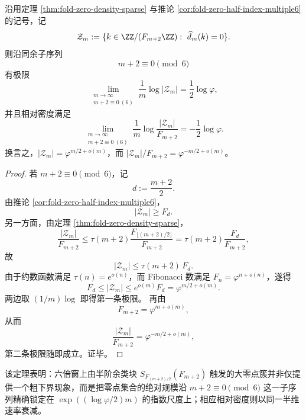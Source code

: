 \begin{theorem}[谱零点集合的半维指数律]\label{thm:xi-fold-zero-set-half-dimensional-exponent-law}
沿用定理 \ref{thm:fold-zero-density-sparse} 与推论 \ref{cor:fold-zero-half-index-multiple6} 的记号，记
\[
\mathcal Z_m:=\{k\in \ZZ/(F_{m+2}\ZZ):\ \widehat d_m(k)=0\}.
\]
则沿同余子序列
\[
m+2\equiv 0\pmod 6
\]
有极限
\[
\boxed{\;
\lim_{\substack{m\to\infty\\ m+2\equiv 0\ (6)}}
\frac{1}{m}\log|\mathcal Z_m|
=
\frac12\log\varphi,\;}
\]
并且相对密度满足
\[
\boxed{\;
\lim_{\substack{m\to\infty\\ m+2\equiv 0\ (6)}}
\frac{1}{m}\log\frac{|\mathcal Z_m|}{F_{m+2}}
=
-\frac12\log\varphi.\;}
\]
换言之，\(|\mathcal Z_m|=\varphi^{m/2+o(m)}\)，而 \(|\mathcal Z_m|/F_{m+2}=\varphi^{-m/2+o(m)}\)。
\end{theorem}
\begin{proof}
若 \(m+2\equiv 0\pmod 6\)，记
\[
d:=\frac{m+2}{2}.
\]
由推论 \ref{cor:fold-zero-half-index-multiple6}，
\[
|\mathcal Z_m|\ge F_d.
\]
另一方面，由定理 \ref{thm:fold-zero-density-sparse}，
\[
\frac{|\mathcal Z_m|}{F_{m+2}}
\le
\tau(m+2)\frac{F_{\lfloor (m+2)/2\rfloor}}{F_{m+2}}
=
\tau(m+2)\frac{F_d}{F_{m+2}},
\]
故
\[
|\mathcal Z_m|\le \tau(m+2)\,F_d.
\]
由于约数函数满足 \(\tau(n)=e^{o(n)}\)，而 Fibonacci 数满足 \(F_n=\varphi^{n+o(n)}\)，遂得
\[
F_d\le |\mathcal Z_m|\le e^{o(m)}F_d=\varphi^{m/2+o(m)}.
\]
两边取 \((1/m)\log\) 即得第一条极限。
再由
\[
F_{m+2}=\varphi^{m+o(m)},
\]
从而
\[
\frac{|\mathcal Z_m|}{F_{m+2}}
=
\varphi^{-m/2+o(m)},
\]
第二条极限随即成立。证毕。
\end{proof}
\noindent 该定理表明：六倍窗上由半阶余类块
\(
S_{F_{(m+2)/2}}(F_{m+2})
\)
触发的大零点簇并非仅提供一个粗下界现象，而是把零点集合的绝对规模沿
\(
m+2\equiv 0\pmod 6
\)
这一子序列精确锁定在
\(
\exp((\log\varphi/2)m)
\)
的指数尺度上；相应相对密度则以同一半维速率衰减。

